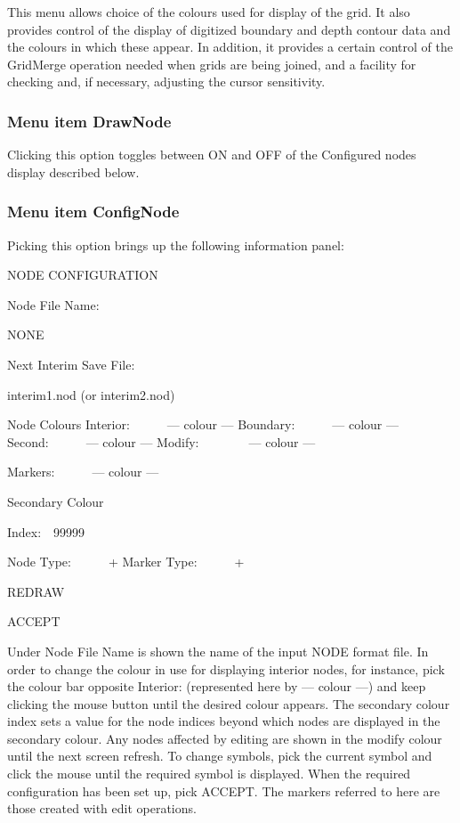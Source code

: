 \documentclass{article}
\begin{document}
This menu allows choice of the colours used for display of the grid. It also provides control of the display of digitized boundary and depth contour data and the colours in which these appear. In addition, it provides a certain control of the GridMerge operation needed when grids are being joined, and a facility for checking and, if necessary, adjusting the cursor sensitivity.

\subsubsection[Menu item DrawNode]{Menu item DrawNode}
Clicking this option toggles between ON and OFF of the Configured nodes display described below.

\subsubsection[Menu item ConfigNode]{Menu item ConfigNode}
Picking this option brings up the following information panel:

NODE CONFIGURATION

Node File Name:\ \ \ \ 

NONE \newline


Next Interim Save File:\ \ \ \ 

interim1.nod (or interim2.nod)


\bigskip

Node Colours\newline
Interior:\ \ \ \ \ \ {}--- colour ---\newline
Boundary:\ \ \ \ \ \ {}--- colour ---\newline
Second:\ \ \ \ \ \ {}--- colour ---\newline
Modify:\ \ \ \ \ \ \ \ {}--- colour ---

Markers:\ \ \ \ \ \ {}--- colour ---


\bigskip

Secondary Colour 

Index:\ \ 99999


\bigskip

Node Type:\ \ \ \ \ \ +\newline
Marker Type:\ \ \ \ \ \ +

REDRAW

ACCEPT


\bigskip

Under {\textquotedbl} Node File Name{\textquotedbl} is shown the name of the input NODE format file. In order to change the colour in use for displaying interior nodes, for instance, pick the colour bar opposite Interior: (represented here by --- colour ---) and keep clicking the mouse button until the desired colour appears. The secondary colour index sets a value for the node indices beyond which nodes are displayed in the secondary colour. Any nodes affected by editing are shown in the {\textquotedbl}modify{\textquotedbl} colour until the next screen refresh. To change symbols, pick the current symbol and click the mouse until the required symbol is displayed. When the required configuration has been set up, pick ACCEPT. The markers referred to here are those created with edit operations.
\end{document}
